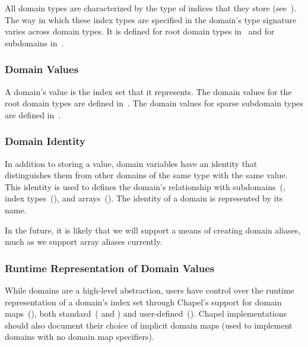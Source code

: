 All domain types are characterized by the type of indices that they
store (see~).  The way in which these index types
are specified in the domain's type signature varies across domain
types.  It is defined for root domain types
in~ and for subdomains
in~.

\subsubsection{Domain Values}
\label{Domain_Values}

A domain's value is the index set that it represents.  The domain
values for the root domain types are defined in~.
The domain values for sparse subdomain types are defined
in~.

\subsubsection{Domain Identity}
\label{Domain_Identity}

In addition to storing a value, domain variables have an identity that
distinguishes them from other domains of the same type with the same
value.  This identity is used to defines the domain's relationship
with subdomains~(, index types~(),
and arrays~().  The identity of
a domain is represented by its name.

\begin{openissue}
In the future, it is likely that we will support a means of creating
domain aliases, much as we support array aliases currently.
\end{openissue}

\subsubsection{Runtime Representation of Domain Values}
\label{Domain_Runtime_Representation}

While domains are a high-level abstraction, users have control over
the runtime representation of a domain's index set through Chapel's
support for domain maps~(), both
standard~( and )
and user-defined~().  Chapel
implementations should also document their choice of implicit domain
maps (used to implement domains with no domain map specifiers).


